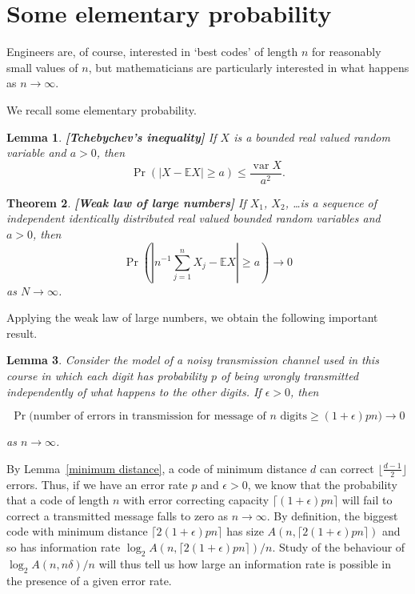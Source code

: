 \documentclass[12pt,a4paper]{article}
\theoremstyle{plain}
\newtheorem{theorem}{Theorem}[section]
\newtheorem{lemma}[theorem]{Lemma}
\theoremstyle{definition}
\newcommand{\Var}{\operatorname{var}}
\begin{document}
    \section{Some elementary probability}
    Engineers are, of course, interested in `best codes'
    of length $n$ for reasonably small values of $n$,
    but mathematicians are particularly interested
    in what happens as $n\rightarrow\infty$.

    We recall some elementary probability.
    \begin{lemma} {\bf [Tchebychev's inequality]}
        If $X$ is a bounded real valued random variable
        and $a>0$, then
        \[\Pr(|X-{\mathbb E}X|\geq a)\leq\frac{\Var X}{a^{2}}.\]
    \end{lemma}
    \begin{theorem} {\bf [Weak law of large numbers]}
        If $X_{1}$, $X_{2}$, \dots is a sequence of independent
        identically distributed real valued bounded
        random variables and $a>0$, then
        \[\Pr\left(\left|n^{-1}\sum_{j=1}^{n}X_{j}
        -{\mathbb E}X\right|\geq a\right)\rightarrow 0\]
        as $N\rightarrow\infty$.
    \end{theorem}
    Applying the weak law of large numbers,
    we obtain the following important result.
    \begin{lemma}
        Consider the model of a noisy transmission
        channel used in this course in which each digit
        has probability $p$ of being wrongly transmitted
        independently of what happens to the other digits.
        If $\epsilon>0$, then
        \begin{small}
            \[\Pr\big(\text{number of errors in transmission for
            message of $n$ digits}\geq (1+\epsilon)pn\big) \rightarrow 0\]
        \end{small}
        as $n\rightarrow\infty$.
    \end{lemma}
    By
    Lemma~\ref{minimum distance},
    a code of minimum distance
    $d$ can correct
    $\lfloor\frac{d-1}{2}\rfloor$ errors.
    Thus, if we have an error rate $p$
    and $\epsilon>0$, we know that
    the probability that a
    code of length $n$ with error correcting capacity
    $\lceil (1+\epsilon)pn\rceil$
    will fail to correct a transmitted message
    falls to zero as $n\rightarrow\infty$.
    By definition, the biggest code with
    minimum distance $\lceil 2(1+\epsilon)pn \rceil$
    has size $A(n,\lceil 2(1+\epsilon)pn \rceil)$
    and so has information rate
    $\log_{2}A(n,\lceil 2(1+\epsilon)pn \rceil)/n$.
    Study of the behaviour of $\log_{2}A(n,n\delta)/n$
    will thus tell us how large an information
    rate is possible in the presence of a given error
    rate.
\end{document}
